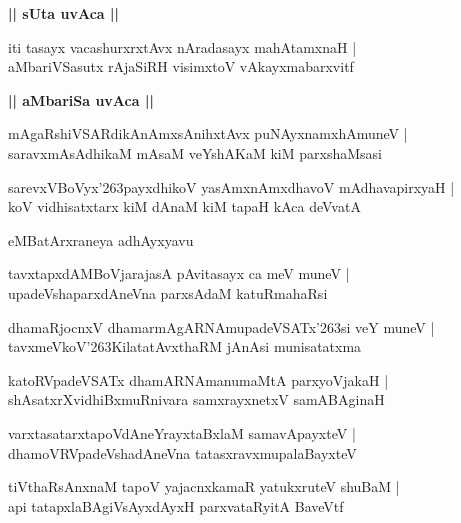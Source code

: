 \documentclass[twoside,12pt,openright]{book}
\def\S{\char'263}
\newcounter{shloka}[chapter]
\def\uvaca#1{\centerline{{\large\textbf{#1}}}}
\begin{document}
\uvaca{|| sUta uvAca ||}

\begin{shloka}%
iti tasayx vacashurxrxtAvx nAradasayx mahAtamxnaH |\\
aMbariVSasutx rAjaSiRH visimxtoV vAkayxmabarxvitf 
\end{shloka}

\uvaca{|| aMbariSa uvAca ||}

\begin{shloka}%
mAgaRshiVSARdikAnAmxsAnihxtAvx puNAyxnamxhAmuneV |\\
saravxmAsAdhikaM mAsaM veYshAKaM kiM parxshaMsasi 
\end{shloka}

\begin{shloka}%
sarevxVBoVyx\S payxdhikoV yasAmxnAmxdhavoV mAdhavapirxyaH |\\
koV vidhisatxtarx kiM dAnaM kiM tapaH kAca deVvatA 
\end{shloka}

\begin{center}
eMBatArxraneya adhAyxyavu
\end{center}

\begin{shloka}%
tavxtapxdAMBoVjarajasA pAvitasayx ca meV muneV |\\
upadeVshaparxdAneVna parxsAdaM katuRmahaRsi 
\end{shloka}

\begin{shloka}%
dhamaRjocnxV dhamarmAgARNAmupadeVSATx\S si veY muneV |\\
tavxmeVkoV\S KilatatAvxthaRM jAnAsi munisatatxma 
\end{shloka}

\begin{shloka}%
katoRVpadeVSATx dhamARNAmanumaMtA parxyoVjakaH |\\
shAsatxrXvidhiBxmuRnivara samxrayxnetxV samABAginaH 
\end{shloka}

\begin{shloka}%
varxtasatarxtapoVdAneYrayxtaBxlaM samavApayxteV |\\
dhamoVRVpadeVshadAneVna tatasxravxmupalaBayxteV 
\end{shloka}

\begin{shloka}%
tiVthaRsAnxnaM tapoV yajacnxkamaR yatukxruteV shuBaM |\\
api tatapxlaBAgiVsAyxdAyxH parxvataRyitA BaveVtf 
\end{shloka}
\end{document}
